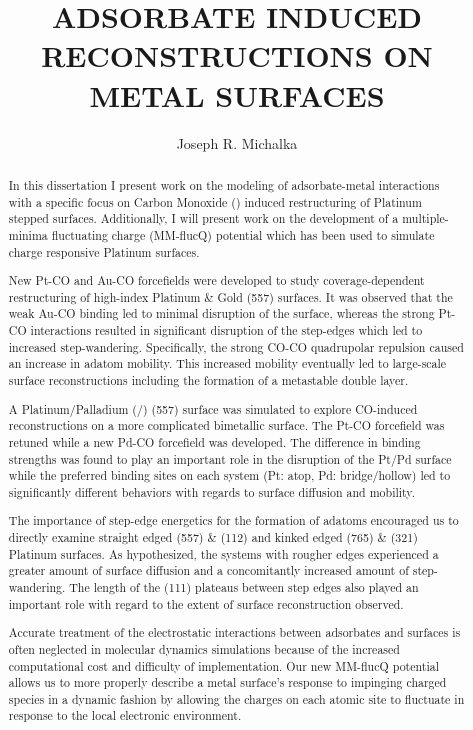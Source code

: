 \begin{abstract}
\label{chap:abstract}
\title{ADSORBATE INDUCED RECONSTRUCTIONS ON METAL SURFACES}
\author{Joseph R. Michalka}
In this dissertation I present work on the modeling of adsorbate-metal
interactions with a specific focus on Carbon Monoxide () induced
restructuring of Platinum stepped surfaces. Additionally, I will present work
on the development of a multiple-minima fluctuating charge (MM-flucQ) potential
which has been used to simulate charge responsive Platinum surfaces.

New Pt-CO and Au-CO forcefields were developed to study coverage-dependent
restructuring of high-index Platinum \& Gold (557) surfaces. It was observed
that the weak Au-CO binding led to minimal disruption of the surface, whereas
the strong Pt-CO interactions resulted in significant disruption of the
step-edges which led to increased step-wandering. Specifically, the strong
CO-CO quadrupolar repulsion caused an increase in adatom mobility. This
increased mobility eventually led to large-scale surface reconstructions
including the formation of a metastable double layer.

A Platinum/Palladium (/) (557) surface was simulated to explore
CO-induced reconstructions on a more complicated bimetallic surface. The Pt-CO
forcefield was retuned while a new Pd-CO forcefield was developed.  The
difference in binding strengths was found to play an important role in the
disruption of the Pt/Pd surface while the preferred binding sites on each
system (Pt: atop, Pd: bridge/hollow) led to significantly different behaviors
with regards to surface diffusion and mobility.

The importance of step-edge energetics for the formation of adatoms encouraged
us to directly examine straight edged (557) \& (112) and kinked edged (765) \&
(321) Platinum surfaces.  As hypothesized, the systems with rougher edges
experienced a greater amount of surface diffusion and a concomitantly increased
amount of step-wandering. The length of the (111) plateaus between step edges
also played an important role with regard to the extent of surface
reconstruction observed.

Accurate treatment of the electrostatic interactions between adsorbates and
surfaces is often neglected in molecular dynamics simulations because of the
increased computational cost and difficulty of implementation.  Our new
MM-flucQ potential allows us to more properly describe a metal surface's
response to impinging charged species in a dynamic fashion by allowing the
charges on each atomic site to fluctuate in response to the local electronic
environment.
\end{abstract}

